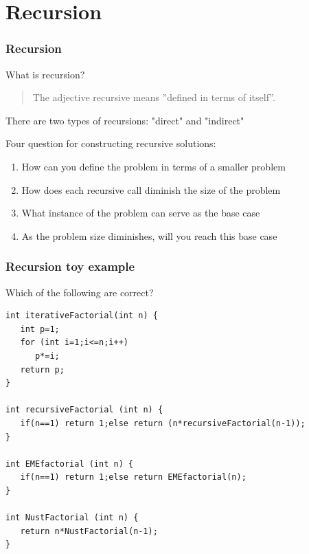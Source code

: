 \documentclass{beamer}
\begin{document}
\section{Recursion}
\begin{frame}
\frametitle{Recursion}
What is recursion?
\begin{verse}
The adjective recursive means ''defined in terms of itself''. 
\end{verse}
There are two types of recursions: "direct" and "indirect" 

\medskip

Four question for constructing recursive solutions:

\begin{enumerate}
\item How can you define the problem in terms of a smaller problem
\item How does each recursive call diminish the size of the problem
\item What instance of the problem can serve as the base case
\item As the problem size diminishes, will you reach this base case
\end{enumerate}

\end{frame}
\begin{frame}[fragile]
\frametitle{Recursion toy example}
Which of the following are correct?

\begin{block}

\begin{scriptsize}

\begin{verbatim}
int iterativeFactorial(int n) {
   int p=1;
   for (int i=1;i<=n;i++)
      p*=i;
   return p;
}

int recursiveFactorial (int n) {
   if(n==1) return 1;else return (n*recursiveFactorial(n-1));
}

int EMEfactorial (int n) {
   if(n==1) return 1;else return EMEfactorial(n);
}

int NustFactorial (int n) {
   return n*NustFactorial(n-1);
}
\end{verbatim}

\end{scriptsize}

\end{block}

\end{frame}
\end{document}
